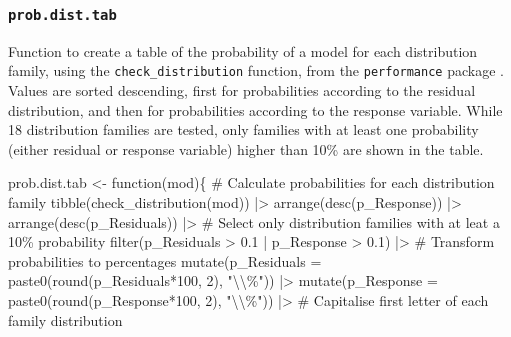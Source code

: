 \documentclass[
  bookmarksnumbered]{article}
\newenvironment{Shaded}{\begin{snugshade}}{\end{snugshade}}
\newcommand{\AttributeTok}[1]{\textcolor[rgb]{0.80,0.80,0.80}{#1}}
\newcommand{\CommentTok}[1]{\textcolor[rgb]{0.50,0.62,0.50}{#1}}
\newcommand{\ControlFlowTok}[1]{\textcolor[rgb]{0.94,0.87,0.69}{#1}}
\newcommand{\DecValTok}[1]{\textcolor[rgb]{0.86,0.86,0.80}{#1}}
\newcommand{\FloatTok}[1]{\textcolor[rgb]{0.75,0.75,0.82}{#1}}
\newcommand{\FunctionTok}[1]{\textcolor[rgb]{0.94,0.94,0.56}{#1}}
\newcommand{\NormalTok}[1]{\textcolor[rgb]{0.80,0.80,0.80}{#1}}
\newcommand{\OtherTok}[1]{\textcolor[rgb]{0.94,0.94,0.56}{#1}}
\newcommand{\SpecialCharTok}[1]{\textcolor[rgb]{0.86,0.64,0.64}{#1}}
\newcommand{\StringTok}[1]{\textcolor[rgb]{0.80,0.58,0.58}{#1}}
\begin{document}
\subsubsection{\texorpdfstring{\texttt{prob.dist.tab}}{prob.dist.tab}}\label{prob.dist.tab}

Function to create a table of the probability of a model for each distribution family, using the \texttt{check\_distribution} function, from the \texttt{performance} package \autocite{ludecke2021}. Values are sorted descending, first for probabilities according to the residual distribution, and then for probabilities according to the response variable. While 18 distribution families are tested, only families with at least one probability (either residual or response variable) higher than 10\% are shown in the table.

\begin{Shaded}
\begin{Highlighting}[]
\NormalTok{prob.dist.tab }\OtherTok{\textless{}{-}} \ControlFlowTok{function}\NormalTok{(mod)\{}
  \CommentTok{\# Calculate probabilities for each distribution family}
  \FunctionTok{tibble}\NormalTok{(}\FunctionTok{check\_distribution}\NormalTok{(mod)) }\SpecialCharTok{|\textgreater{}}
    \FunctionTok{arrange}\NormalTok{(}\FunctionTok{desc}\NormalTok{(p\_Response)) }\SpecialCharTok{|\textgreater{}} 
    \FunctionTok{arrange}\NormalTok{(}\FunctionTok{desc}\NormalTok{(p\_Residuals)) }\SpecialCharTok{|\textgreater{}} 
  \CommentTok{\# Select only distribution families with at leat a 10\% probability}
  \FunctionTok{filter}\NormalTok{(p\_Residuals }\SpecialCharTok{\textgreater{}} \FloatTok{0.1} \SpecialCharTok{|}\NormalTok{ p\_Response }\SpecialCharTok{\textgreater{}} \FloatTok{0.1}\NormalTok{) }\SpecialCharTok{|\textgreater{}} 
  \CommentTok{\# Transform probabilities to percentages}
  \FunctionTok{mutate}\NormalTok{(}\AttributeTok{p\_Residuals =} \FunctionTok{paste0}\NormalTok{(}\FunctionTok{round}\NormalTok{(p\_Residuals}\SpecialCharTok{*}\DecValTok{100}\NormalTok{, }\DecValTok{2}\NormalTok{), }\StringTok{"}\SpecialCharTok{\textbackslash{}\textbackslash{}}\StringTok{\%"}\NormalTok{)) }\SpecialCharTok{|\textgreater{}} 
  \FunctionTok{mutate}\NormalTok{(}\AttributeTok{p\_Response =} \FunctionTok{paste0}\NormalTok{(}\FunctionTok{round}\NormalTok{(p\_Response}\SpecialCharTok{*}\DecValTok{100}\NormalTok{, }\DecValTok{2}\NormalTok{), }\StringTok{"}\SpecialCharTok{\textbackslash{}\textbackslash{}}\StringTok{\%"}\NormalTok{)) }\SpecialCharTok{|\textgreater{}} 
  \CommentTok{\# Capitalise first letter of each family distribution}

\end{Highlighting}
\end{Shaded}
\end{document}

